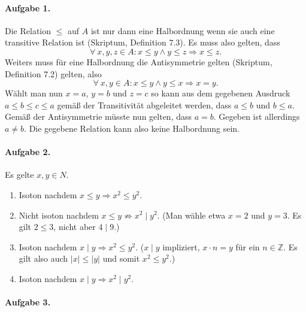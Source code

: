 \documentclass{article}
\begin{document}
\paragraph{Aufgabe 1.}

Die Relation $\leq$ auf $A$ ist nur dann eine Halbordnung wenn sie auch eine transitive Relation ist (Skriptum, Definition 7.3). Es muss also gelten, dass
\begin{equation*}
    \forall\ x, y, z \in A : x \leq y \land y \leq z \Rightarrow x \leq z.
\end{equation*}
Weiters muss für eine Halbordnung die Antisymmetrie gelten (Skriptum, Definition 7.2) gelten, also
\begin{equation*}
    \forall\ x, y \in A : x \leq y \land y \leq x \Rightarrow x = y.
\end{equation*}
Wählt man nun $x = a$, $y = b$ und $z = c$ so kann aus dem gegebenen Ausdruck $a \leq b \leq c \leq a$ gemäß der Transitivität abgeleitet werden, dass $a \leq b$ und $b \leq a$. Gemäß der Antisymmetrie müsste nun gelten, dass $a = b$. Gegeben ist allerdings $a \neq b$. Die gegebene Relation kann also keine Halbordnung sein.

\paragraph{Aufgabe 2.}

Es gelte $x, y \in N$.

\begin{enumerate}[label=\alph*)]
    \item Isoton nachdem $x \leq y \Rightarrow x^2 \leq y^2$.

    \item Nicht isoton nachdem $x \leq y \nRightarrow x^2 \mid y^2$. (Man wähle etwa $x = 2$ und $y = 3$. Es gilt $2 \leq 3$, nicht aber $4 \mid 9$.)

    \item Isoton nachdem $x \mid y \Rightarrow x^2 \leq y^2$. ($x \mid y$ impliziert, $x \cdot n = y$ für ein $n \in \mathbb{Z}$. Es gilt also auch $\lvert x\rvert \leq \lvert y\rvert$ und somit $x^2 \leq y^2$.)

    \item Isoton nachdem $x \mid y \Rightarrow x^2 \mid y^2$.
\end{enumerate}

\paragraph{Aufgabe 3.}
\end{document}
